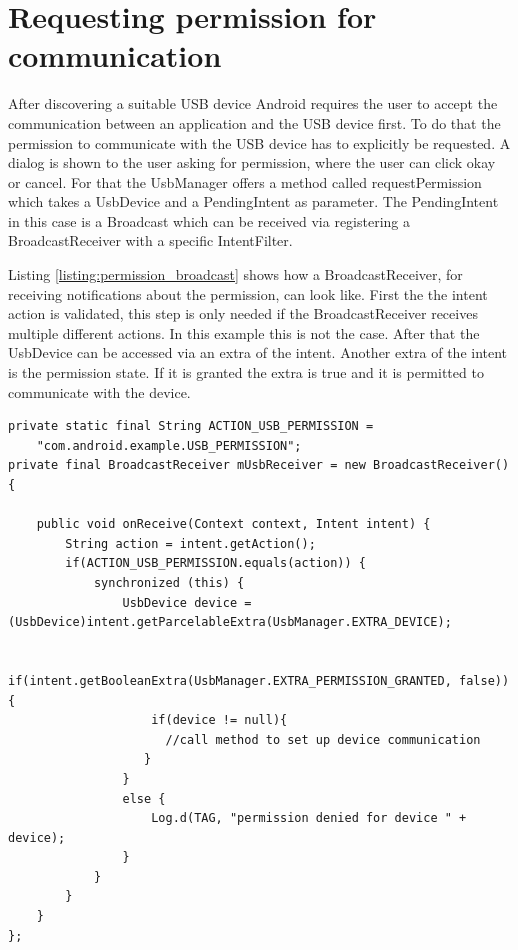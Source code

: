 \section{Requesting permission for communication}
\label{section:request_permission}

After discovering a suitable USB device Android requires the user to accept the communication between an application and the USB device first. To do that the permission to communicate with the USB device has to explicitly be requested. A dialog is shown to the user asking for permission, where the user can click okay or cancel. For that the UsbManager offers a method called requestPermission which takes a UsbDevice and a PendingIntent as parameter. The PendingIntent in this case is a Broadcast which can be received via registering a BroadcastReceiver with a specific IntentFilter.

Listing \ref{listing:permission_broadcast} shows how a BroadcastReceiver, for receiving notifications about the permission, can look like. First the the intent action is validated, this step is only needed if the BroadcastReceiver receives multiple different actions. In this example this is not the case. After that the UsbDevice can be accessed via an extra of the intent. Another extra of the intent is the permission state. If it is granted the extra is true and it is permitted to communicate with the device.

\begin{lstlisting}[caption=Permission BroadcastReceiver \cite{android_usb_host}, label=listing:permission_broadcast]
private static final String ACTION_USB_PERMISSION =
    "com.android.example.USB_PERMISSION";
private final BroadcastReceiver mUsbReceiver = new BroadcastReceiver() {

    public void onReceive(Context context, Intent intent) {
        String action = intent.getAction();
        if(ACTION_USB_PERMISSION.equals(action)) {
            synchronized (this) {
                UsbDevice device = (UsbDevice)intent.getParcelableExtra(UsbManager.EXTRA_DEVICE);

                if(intent.getBooleanExtra(UsbManager.EXTRA_PERMISSION_GRANTED, false)) {
                    if(device != null){
                      //call method to set up device communication
                   }
                } 
                else {
                    Log.d(TAG, "permission denied for device " + device);
                }
            }
        }
    }
};
\end{lstlisting}

